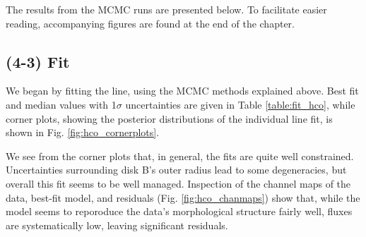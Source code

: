 The results from the MCMC runs are presented below. To facilitate easier reading, accompanying figures are found at the end of the chapter.




\subsection{\hco (4-3) Fit}
\label{subsection:hco_fit}

We began by fitting the \hco line, using the MCMC methods explained above. Best fit and median values with 1$\sigma$  uncertainties are given in Table \ref{table:fit_hco}, while corner plots, showing the posterior distributions of the individual line fit, is shown in Fig. \ref{fig:hco_cornerplots}.


We see from the corner plots that, in general, the fits are quite well constrained. Uncertainties surrounding disk B's outer radius lead to some degeneracies, but overall this fit seems to be well managed. Inspection of the channel maps of the \hco data, best-fit model, and residuals (Fig. \ref{fig:hco_chanmaps}) show that, while the model seems to reporoduce the data's morphological structure fairly well, fluxes are systematically low, leaving significant residuals.

